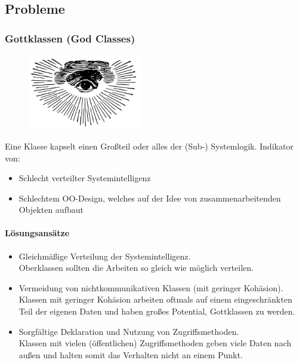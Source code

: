 \documentclass[
    ngerman,
    color=3b,
    summary,
    boxarc,
    main,
]{rubos-tuda-template}
\begin{document}
\subsection{Probleme}
\subsubsection{Gottklassen (God Classes)}%
\begin{figure}%
    \vspace*{-5mm}
    \includegraphics[width=5cm]{bilder/Godclass.pdf}
\end{figure}
Eine Klasse kapselt einen Großteil oder alles der (Sub-) Systemlogik. Indikator von:
\begin{itemize}
    \item Schlecht verteilter Systemintelligenz
    \item Schlechtem OO-Design, welches auf der Idee von zusammenarbeitenden Objekten aufbaut
\end{itemize}

\paragraph{Lösungsansätze}\mbox{}\par
\begin{itemize}
    \item Gleichmäßige Verteilung der Systemintelligenz. \\
          Oberklassen sollten die Arbeiten so gleich wie möglich verteilen.
    \item Vermeidung von nichtkommunikativen Klassen (mit geringer Kohäsion). \\
          Klassen mit geringer Kohäsion arbeiten oftmals auf einem eingeschränkten Teil der eigenen Daten und haben großes Potential, Gottklassen zu werden.
    \item Sorgfältige Deklaration und Nutzung von Zugriffsmethoden. \\
          Klassen mit vielen (öffentlichen) Zugriffsmethoden geben viele Daten nach außen und halten somit das Verhalten nicht an einem Punkt.
\end{itemize}
\end{document}
